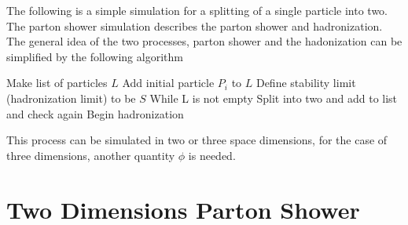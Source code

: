 The following is a simple simulation for a splitting of a single particle into two. The parton shower simulation describes the parton shower and hadronization. The general idea of the two processes, parton shower and the hadonization can be simplified by the following algorithm
\begin{algorithmic}\label{logrithm}
\State Make list of particles $L$ 
\State Add initial particle $P_{i}$ to $L$
\State Define stability limit (hadronization limit) to be $S$  
\State While L is not empty
	\State Split into two and add to list and check again 
\Else 
	\State Begin hadronization  
\EndIf
\end{algorithmic}

This process can be simulated in two or three space dimensions, for the case of three dimensions, another quantity $\phi$ is needed.

%
%
%
%
%
%
%
%
%
%
%
\section{Two Dimensions Parton Shower}

